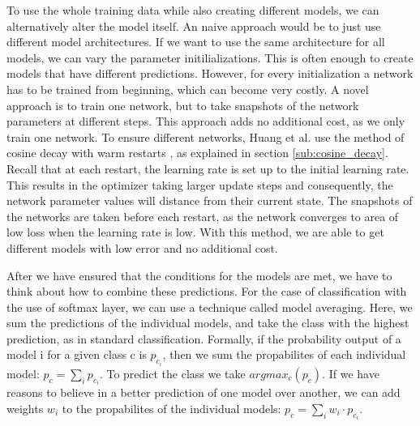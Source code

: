 To use the whole training data while also creating different models, we can
alternatively alter the model itself. An naive approach would be to just use
different model architectures. If we want to use the same architecture for all
models, we can vary the parameter initilializations. This is often enough to
create models that have different predictions. However, for every initialization
a network has to be trained from beginning, which can become very costly. A
novel approach is to train one network, but to take snapshots of the network
parameters at different steps. This approach adds no additional cost, as we only
train one network. To ensure different networks, Huang et al.
\cite{huang2017snapshot} use the method of cosine decay with warm restarts
\cite{loshchilov2016sgdr}, as explained in section \ref{sub:cosine_decay}.
Recall that at each restart, the learning rate is set up to the initial learning
rate. This results in the optimizer taking larger update steps and consequently,
the network parameter values will distance from their current state. The
snapshots of the networks are taken before each restart, as the network
converges to area of low loss when the learning rate is low. With this method,
we are able to get different models with low error and no additional cost.

After we have ensured that the conditions for the models are met, we have to
think about how to combine these predictions. For the case of classification
with the use of softmax layer, we can use a technique called model averaging.
Here, we sum the predictions of the individual models, and take the class with
the highest prediction, as in standard classification. Formally, if the
probability output of a model i for a given class c is $p_{c_i}$, then we sum
the propabilites of each individual model: $p_c = \sum_i p_{c_i}$. To predict
the class we take $argmax_c(p_c)$. If we have reasons to believe in a better
prediction of one model over another, we can add weights $w_i$ to the
propabilites of the individual models: $p_c = \sum_i w_i \cdot p_{c_i}$.


\begin{comment}
Further aspects that could be included:
- classififcation in general
- cross entropy loss and loss functions
- gradient descent


openquestions:
where generalization gap
areas ofsame loss better
expand sgd warm restart


\end{comment}